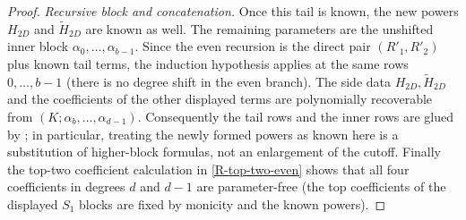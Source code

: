 \begin{proof}
      \smallskip\noindent\emph{Recursive block and concatenation.}
      Once this tail is known, the new powers $H_{2D}$ and
      $\widetilde H_{2D}$ are known as well.  The remaining parameters are the
      unshifted inner block $\alpha_0,\ldots,\alpha_{b-1}$.  Since the even
      recursion is the direct pair $(R'_1,R'_2)$ plus known tail terms, the
      induction hypothesis applies at the same rows $0,\ldots,b-1$ (there is
      no degree shift in the even branch).  The side data
      $H_{2D},\widetilde H_{2D}$ and the coefficients of the other displayed
      terms are polynomially recoverable from
      $(K;\alpha_b,\ldots,\alpha_{d-1})$.  Consequently the tail rows and the
      inner rows are glued by
      ; in particular, treating the
      newly formed powers as known here is a substitution of higher-block
      formulas, not an enlargement of the cutoff.  Finally the top-two coefficient
      calculation in \eqref{R-top-two-even} shows that all four coefficients
      in degrees $d$ and $d-1$ are parameter-free (the top coefficients of
      the displayed $S_1$ blocks are fixed by monicity and the known powers).


\end{proof}
